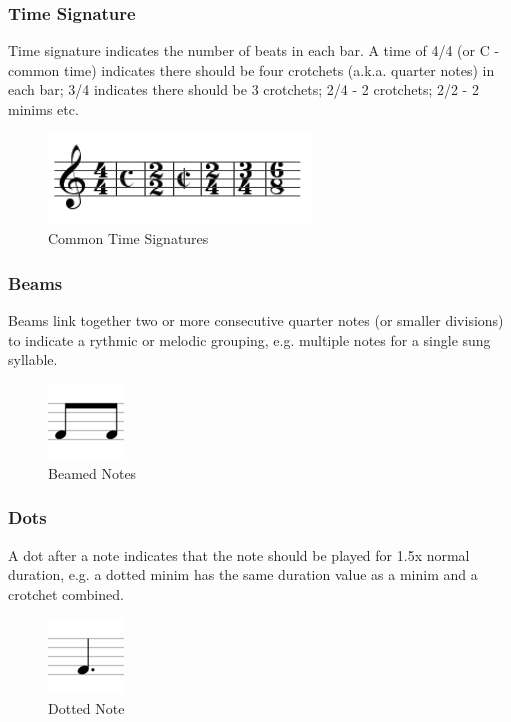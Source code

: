         \subsubsection{Time Signature}
            Time signature indicates the number of beats in each bar. A time of 4/4 (or C - common time) indicates there should be four crotchets (a.k.a. quarter notes) in each bar; 3/4 indicates there should be 3 crotchets; 2/4 - 2 crotchets; 2/2 - 2 minims etc.
            \begin{figure}[h!]
                \centering
                \includegraphics[width=70mm]{./assets/timesignatures.png}
                \caption{Common Time Signatures}
                \label{image:timesignatures}
            \end{figure}
        \subsubsection{Beams}
        Beams link together two or more consecutive quarter notes (or smaller divisions) to indicate a rythmic or melodic grouping, e.g. multiple notes for a single sung syllable. 
            \begin{figure}[h!]
                \centering
                \includegraphics[width=20mm]{./assets/beam.png}
                \caption{Beamed Notes}
                \label{image:beam}
            \end{figure}
        \subsubsection{Dots}
            A dot after a note indicates that the note should be played for 1.5x normal duration, e.g. a dotted minim has the same duration value as a minim and a crotchet combined.
            \begin{figure}[h!]
                \centering
                \includegraphics[width=20mm]{./assets/dotted.png}
                \caption{Dotted Note}
                \label{image:dotted}
            \end{figure}
